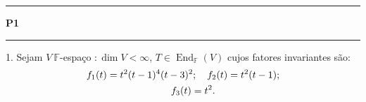 \newcommand{\F}{\mathbb{F}}
\newcommand{\C}{\mathbb{C}}
\newcommand{\an}{\mathscr{A}} 
\newcommand{\Q}{\mathbb{Q}}
\renewcommand{\hom}{\operatorname{Hom}_\F}
\newcommand{\ehom}{\operatorname{End}_\F}

\-\vspace{-0.3cm}
  {\hrule \vspace{-0.15cm}
  \centering \textbf{P1} \vspace{0.1cm}
  \hrule}

1. Sejam \(V \ \F\)-espaço \(:\dim V <\infty \), \(T \in \ehom(V)\) cujos fatores invariantes são: 
\begin{align*}
    f_1(t) = t^2 (t-1)^4 (t-3)^2; \ \ \ f_2(t)= t^2(t-1);  \\ 
    f_3(t)=t^2.\hspace{2.3cm} 
\end{align*}

